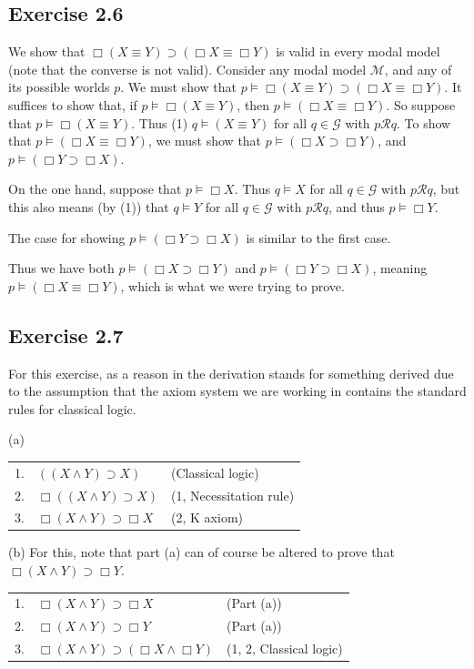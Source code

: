 \documentclass{article}
\theoremstyle{definition}
\begin{document}
\subsection*{Exercise 2.6}
We show that $\Box (X\equiv Y)\supset (\Box X\equiv\Box Y)$ is valid in every modal model (note that the converse is not valid). 
Consider any modal model $\mathcal{M}$, and any of its possible worlds $p$. 
We must show that $p\vDash \Box (X\equiv Y)\supset (\Box X\equiv\Box Y)$.
It suffices to show that, if $p\vDash \Box (X\equiv Y)$, then $p\vDash (\Box X\equiv\Box Y)$. 
So suppose that $p\vDash \Box(X\equiv Y)$. Thus (1) $q\vDash (X\equiv Y)$ for all $q\in\mathcal{G}$ with 
$p\mathcal{R}q$. To show that $p\vDash (\Box X\equiv \Box Y)$, we must show that 
$p\vDash (\Box X\supset \Box Y)$, and $p\vDash (\Box Y\supset \Box X)$.

On the one hand, suppose that $p\vDash \Box X$. Thus $q\vDash X$ for all $q\in\mathcal{G}$ with 
$p\mathcal{R}q$, but this also means (by (1)) that $q\vDash Y$ for all $q\in\mathcal{G}$ with 
$p\mathcal{R}q$, and thus $p\vDash \Box Y$.

The case for showing $p\vDash (\Box Y\supset\Box X)$ is similar to the first case.

Thus we have both $p\vDash (\Box X\supset \Box Y)$ and $p\vDash (\Box Y\supset \Box X)$, meaning 
$p\vDash (\Box X\equiv\Box Y)$, which is what we were trying to prove.

\subsection*{Exercise 2.7}
For this exercise,  as a reason in the derivation stands for something derived due to the 
assumption that the axiom system we are working in contains the standard rules for classical logic.

(a) \begin{center}
\begin{tabular}{lll}
1. & $((X\wedge Y)\supset X)$ & (Classical logic) \\
2. & $\Box((X\wedge Y)\supset X)$ & (1, Necessitation rule) \\
3. & $\Box(X\wedge Y)\supset\Box X$ & (2, K axiom)
\end{tabular}
\end{center}

(b)
For this, note that part (a) can of course be altered to prove that 
$\Box (X\wedge Y)\supset\Box Y$.
\begin{center}
\begin{tabular}{lll}
1. & $\Box (X\wedge Y)\supset\Box X$ & (Part (a)) \\
2. & $\Box (X\wedge Y)\supset\Box Y$ & (Part (a)) \\
3. & $\Box (X\wedge Y)\supset (\Box X\wedge\Box Y)$ & (1, 2, Classical logic)
\end{tabular}
\end{center}
\end{document}
